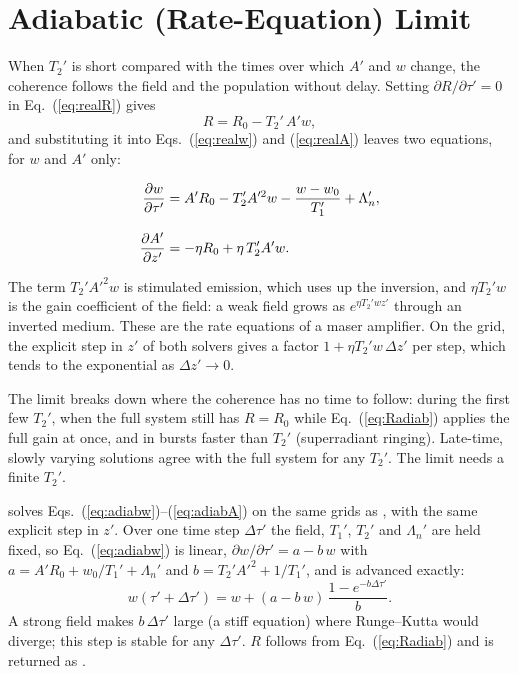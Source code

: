 \documentclass[12pt,a4paper]{article}
\begin{document}
\section{Adiabatic (Rate-Equation) Limit}
\label{sec:adiabatic}

When $T_2'$ is short compared with the times over which $A'$ and $w$ change,
the coherence follows the field and the population without delay. Setting
$\partial R/\partial\tau' = 0$ in Eq.~(\ref{eq:realR}) gives
\begin{equation}
  R = R_0 - T_2'\,A' w ,
  \label{eq:Radiab}
\end{equation}
and substituting it into Eqs.~(\ref{eq:realw}) and (\ref{eq:realA}) leaves two
equations, for $w$ and $A'$ only:

\begin{resultbox}
\begin{align}
  \dfrac{\partial w}{\partial \tau'}
    &= A'R_0 - T_2'A'^2 w - \frac{w - w_0}{T_1'} + \Lambda_n',
  \label{eq:adiabw}\\[8pt]
  \dfrac{\partial A'}{\partial z'}
    &= -\eta R_0 + \eta\, T_2' A' w .
  \label{eq:adiabA}
\end{align}
\end{resultbox}

The term $T_2'A'^2 w$ is stimulated emission, which uses up the inversion, and
$\eta T_2' w$ is the gain coefficient of the field: a weak field grows as
$e^{\eta T_2' w z'}$ through an inverted medium. These are the rate equations of
a maser amplifier.
On the grid, the explicit step in $z'$ of both solvers gives a factor
$1 + \eta T_2' w\,\Delta z'$ per step, which tends to the exponential as
$\Delta z' \to 0$.

The limit breaks down where the coherence has no time to follow: during the first
few $T_2'$, when the full system still has $R = R_0$ while
Eq.~(\ref{eq:Radiab}) applies the full gain at once, and in bursts faster than
$T_2'$ (superradiant ringing). Late-time, slowly varying solutions agree with the
full system for any $T_2'$. The limit needs a finite $T_2'$.

\begin{notebox}
   solves
  Eqs.~(\ref{eq:adiabw})--(\ref{eq:adiabA}) on the same grids as
  , with the same explicit step in $z'$. Over one time step
  $\Delta\tau'$ the field, $T_1'$, $T_2'$ and $\Lambda_n'$ are held fixed, so
  Eq.~(\ref{eq:adiabw}) is linear, $\partial w/\partial\tau' = a - b\,w$ with
  $a = A'R_0 + w_0/T_1' + \Lambda_n'$ and $b = T_2'A'^2 + 1/T_1'$, and is
  advanced exactly:
  \[
    w(\tau' + \Delta\tau') = w + (a - b\,w)\,\frac{1 - e^{-b\Delta\tau'}}{b} .
  \]
  A strong field makes $b\,\Delta\tau'$ large (a stiff equation) where
  Runge--Kutta would diverge; this step is stable for any $\Delta\tau'$.
  $R$ follows from Eq.~(\ref{eq:Radiab}) and is returned as .
\end{notebox}
\end{document}

